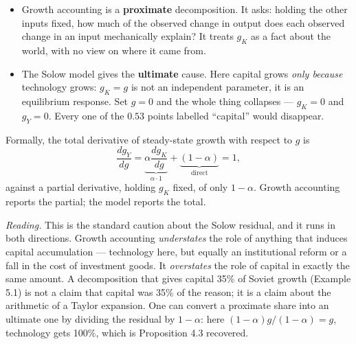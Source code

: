\documentclass[12pt, letterpaper]{article}
\begin{document}
\begin{tcolorbox}[oddbox,title={Problem 5.3 \quad Causes of Growth and Growth Accounting}]
\begin{itemize}[leftmargin=1.3em,itemsep=3pt,topsep=3pt]
\item Growth accounting is a \textbf{proximate} decomposition. It asks: holding the other
      inputs fixed, how much of the observed change in output does each observed change in
      an input mechanically explain? It treats $g_K$ as a fact about the world, with no view
      on where it came from.
\item The Solow model gives the \textbf{ultimate} cause. Here capital grows \emph{only
      because} technology grows: $g_K=g$ is not an independent parameter, it is an
      equilibrium response. Set $g=0$ and the whole thing collapses --- $g_K=0$ and
      $g_Y=0$. Every one of the $0.53$ points labelled ``capital'' would disappear.
\end{itemize}

\smallskip
Formally, the total derivative of steady-state growth with respect to $g$ is
\[
\frac{dg_Y}{dg}
=\underbrace{\alpha\frac{dg_K}{dg}}_{\alpha\cdot 1}+\underbrace{(1-\alpha)}_{\text{direct}}
=1,
\]
against a partial derivative, holding $g_K$ fixed, of only $1-\alpha$. Growth accounting
reports the partial; the model reports the total.

\smallskip
\emph{Reading.} This is the standard caution about the Solow residual, and it runs in both
directions. Growth accounting \emph{understates} the role of anything that induces capital
accumulation --- technology here, but equally an institutional reform or a fall in the cost
of investment goods. It \emph{overstates} the role of capital in exactly the same amount.
A decomposition that gives capital 35\% of Soviet growth (Example 5.1) is not a claim that
capital was 35\% of the reason; it is a claim about the arithmetic of a Taylor expansion.
One can convert a proximate share into an ultimate one by dividing the residual by
$1-\alpha$: here $(1-\alpha)g/(1-\alpha)=g$, technology gets 100\%, which is Proposition 4.3
recovered.
\end{tcolorbox}
\end{document}
